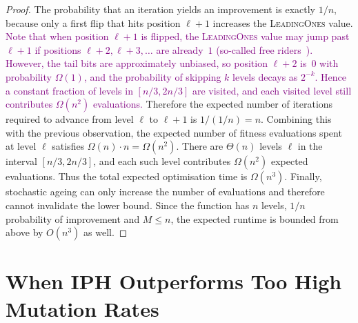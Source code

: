 \documentclass[lettersize,journal]{IEEEtran}
\newcommand{\rerev}[1]{\textcolor{purple}{#1}}
\begin{document}
\begin{proof}
The probability that an iteration yields an improvement is exactly $1/n$, because only a first flip that hits position $\ell+1$ increases the \textsc{LeadingOnes} value. \rerev{Note that when position $\ell+1$ is flipped, the \textsc{LeadingOnes} value may jump past $\ell+1$ if positions $\ell+2, \ell+3, \ldots$ are already~$1$ (so-called free riders~\cite{DrosteJansenWegener2002}). However, the tail bits are approximately unbiased, so position $\ell+2$ is~$0$ with probability $\Omega(1)$, and the probability of skipping $k$ levels decays as $2^{-k}$. Hence a constant fraction of levels in $[n/3, 2n/3]$ are visited, and each visited level still contributes $\Omega(n^2)$ evaluations.} Therefore the expected number of iterations required to advance from level $\ell$ to $\ell+1$ is $1/(1/n)=n$. Combining this with the previous observation, the expected number of fitness evaluations spent at level $\ell$ satisfies $\Omega(n)\cdot n=\Omega(n^2)$.
There are $\Theta(n)$ levels $\ell$ in the interval $[n/3,2n/3]$, and each such level contributes $\Omega(n^2)$ expected evaluations. Thus the total expected optimisation time is $\Omega(n^3)$. Finally, stochastic ageing can only increase the number of evaluations and therefore cannot invalidate the lower bound. Since the function has $n$ levels, $1/n$ probability of improvement and $M\leq n$, the expected runtime is bounded from above by $O(n^3)$ as well.


\end{proof}

 

\section{When IPH Outperforms Too High Mutation Rates}
\end{document}
